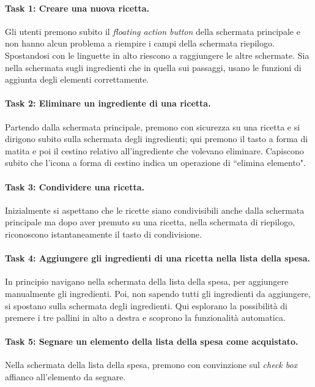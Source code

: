 \paragraph{Task 1: Creare una nuova ricetta.}
Gli utenti premono subito il \textit{floating action button} della schermata principale e non hanno alcun problema a riempire i campi della schermata riepilogo.
Spostandosi con le linguette in alto riescono a raggiungere le altre schermate.
Sia nella schermata sugli ingredienti che in quella sui passaggi, usano le funzioni di aggiunta degli elementi correttamente.

\paragraph{Task 2: Eliminare un ingrediente di una ricetta.}
Partendo dalla schermata principale, premono con sicurezza su una ricetta e si dirigono subito sulla schermata degli ingredienti; qui premono il tasto a forma di matita e poi il cestino relativo all'ingrediente che volevano eliminare.
Capiscono subito che l'icona a forma di cestino indica un operazione di ``elimina elemento".

\paragraph{Task 3: Condividere una ricetta.}
Inizialmente si aspettano che le ricette siano condivisibili anche dalla schermata principale ma dopo aver premuto su una ricetta, nella schermata di riepilogo, riconoscono istantaneamente il tasto di condivisione.

\paragraph{Task 4: Aggiungere gli ingredienti di una ricetta nella lista della spesa.}
In principio navigano nella schermata della lista della spesa, per aggiungere manualmente gli ingredienti.
Poi, non sapendo tutti gli ingredienti da aggiungere, si spostano sulla schermata degli ingredienti.
Qui esplorano la possibilità di premere i tre pallini in alto a destra e scoprono la funzionalità automatica.

\paragraph{Task 5: Segnare un elemento della lista della spesa come acquistato.}
Nella schermata della lista della spesa, premono con convinzione sul \textit{check box} affianco all'elemento da segnare.

